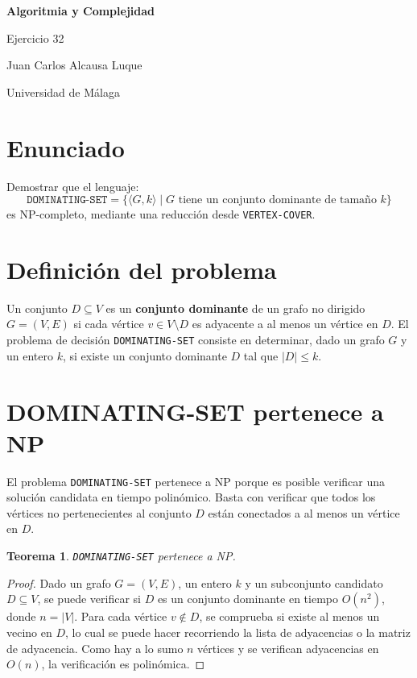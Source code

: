 \documentclass[a4paper,12pt]{article}
\newtheorem{theorem}{Teorema}
\begin{document}
\begin{titlepage}
    \centering
    \vspace*{\fill}
    {\Huge \bfseries Algoritmia y Complejidad\par}
    \vspace{1cm}
    {\huge Ejercicio 32\par}
    \vspace{1cm}
    {\Large Juan Carlos Alcausa Luque \par}
    \vspace*{\fill}
    {\large Universidad de Málaga \par}
\end{titlepage}

\tableofcontents
\newpage

\section{Enunciado}
Demostrar que el lenguaje:
\[
\texttt{DOMINATING-SET} = \{ \langle G, k \rangle \mid G \text{ tiene un conjunto dominante de tamaño } k \}
\]
es NP-completo, mediante una reducción desde \texttt{VERTEX-COVER}.

\section{Definición del problema}
Un conjunto \( D \subseteq V \) es un \textbf{conjunto dominante} de un grafo no dirigido \( G = (V, E) \) si cada vértice \( v \in V \setminus D \) es adyacente a al menos un vértice en \( D \). El problema de decisión \texttt{DOMINATING-SET} consiste en determinar, dado un grafo \( G \) y un entero \( k \), si existe un conjunto dominante \( D \) tal que \( |D| \leq k \).

\section{DOMINATING-SET pertenece a NP}
El problema \texttt{DOMINATING-SET} pertenece a NP porque es posible verificar una solución candidata en tiempo polinómico. Basta con verificar que todos los vértices no pertenecientes al conjunto \( D \) están conectados a al menos un vértice en \( D \).

\begin{theorem}
\texttt{DOMINATING-SET} pertenece a NP.
\end{theorem}

\begin{proof}
Dado un grafo \( G = (V, E) \), un entero \( k \) y un subconjunto candidato \( D \subseteq V \), se puede verificar si \( D \) es un conjunto dominante en tiempo \( O(n^2) \), donde \( n = |V| \). Para cada vértice \( v \notin D \), se comprueba si existe al menos un vecino en \( D \), lo cual se puede hacer recorriendo la lista de adyacencias o la matriz de adyacencia. Como hay a lo sumo \( n \) vértices y se verifican adyacencias en \( O(n) \), la verificación es polinómica.
\end{proof}
\end{document}
